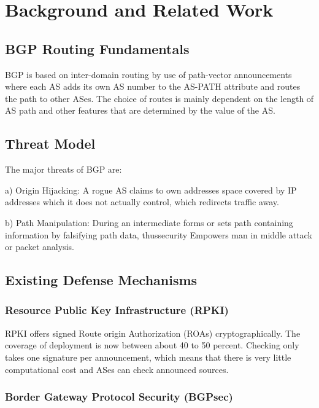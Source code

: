 \documentclass[conference]{IEEEtran}
\begin{document}
\section{Background and Related Work}

\subsection{BGP Routing Fundamentals}

BGP is based on inter-domain routing by use of path-vector announcements where each AS adds its own AS number to the AS-PATH attribute and routes the path to other ASes. The choice of routes is mainly dependent on the length of AS path and other features that are determined by the value of the AS.

\subsection{Threat Model}

The major threats of BGP are:

a) Origin Hijacking: A rogue AS claims to own addresses space covered by IP addresses which it does not actually control, which redirects traffic away.

b) Path Manipulation: During an intermediate forms or sets path containing information by falsifying path data, thussecurity Empowers man in middle attack or packet analysis.

\subsection{Existing Defense Mechanisms}

\subsubsection{Resource Public Key Infrastructure (RPKI)}

RPKI offers signed Route origin Authorization (ROAs) cryptographically. The coverage of deployment is now between about 40 to 50 percent. Checking only takes one signature per announcement, which means that there is very little computational cost and ASes can check announced sources.

\subsubsection{Border Gateway Protocol Security (BGPsec)}
\end{document}
